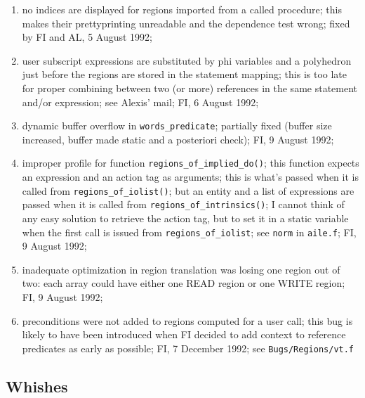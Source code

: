 \begin{enumerate}
  \item no indices are displayed for regions imported from a called
	procedure; this makes their prettyprinting unreadable and
	the dependence test wrong; fixed by FI and AL, 5 August 1992;

  \item user subscript expressions are substituted by phi variables
	and a polyhedron just before the regions are stored in the
	statement mapping; this is too late for proper combining
	between two (or more) references in the same statement and/or
	expression; see Alexis' mail; FI, 6 August 1992;

  \item dynamic buffer overflow in \verb+words_predicate+; partially
	fixed (buffer size increased, buffer made static and a
	posteriori check); FI, 9 August 1992;

  \item improper profile for function \verb+regions_of_implied_do()+;
	this function expects an expression and an action tag as
	arguments; this is what's passed when it is called from
	\verb+regions_of_iolist()+; but an entity and a list of
	expressions are passed when it is called from 
	\verb+regions_of_intrinsics()+; I cannot think of any easy
	solution to retrieve the action tag, but to set it in a static
	variable when the first call is issued from \verb+regions_of_iolist+;
	see \verb+norm+ in \verb+aile.f+; FI, 9 August 1992;

  \item inadequate optimization in region translation was losing one
	region out of two: each array could have either one READ region
	or one WRITE region; FI, 9 August 1992;

  \item preconditions were not added to regions computed for a user
	call; this bug is likely to have been introduced when FI
	decided to add context to reference predicates as early
	as possible; FI, 7 December 1992; see \verb+Bugs/Regions/vt.f+

\end{enumerate}

\subsection{Whishes}

